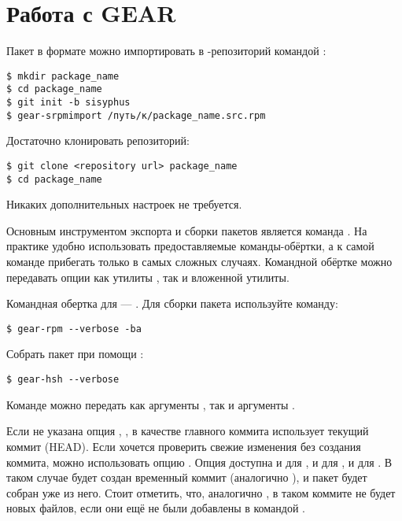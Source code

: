 \section{Работа с GEAR}


Пакет в формате  можно импортировать в -репозиторий командой :
\begin{verbatim}
$ mkdir package_name
$ cd package_name
$ git init -b sisyphus
$ gear-srpmimport /путь/к/package_name.src.rpm
\end{verbatim}


Достаточно клонировать репозиторий:
\begin{verbatim}
$ git clone <repository url> package_name
$ cd package_name
\end{verbatim}
Никаких дополнительных настроек не требуется.


Основным инструментом экспорта и сборки пакетов является команда . На практике удобно
использовать предоставляемые команды-обёртки, а к самой команде  прибегать только в
самых сложных случаях. Командной обёртке можно передавать опции как утилиты , так и
вложенной утилиты.

Командная обертка  для  --- . Для сборки пакета используйте команду:
\begin{verbatim}
$ gear-rpm --verbose -ba
\end{verbatim}


Собрать пакет при помощи :
\begin{verbatim}
$ gear-hsh --verbose
\end{verbatim}

Команде  можно передать как аргументы , так и аргументы .

Если не указана опция , , в качестве главного коммита использует текущий
коммит (HEAD). Если хочется проверить свежие изменения без создания коммита, можно использовать опцию
. Опция  доступна и для , и для , и для . В таком случае
будет создан временный коммит (аналогично ), и пакет будет собран уже из него.
Стоит отметить, что, аналогично , в таком коммите не будет новых файлов, если они
ещё не были добавлены в  командой .

